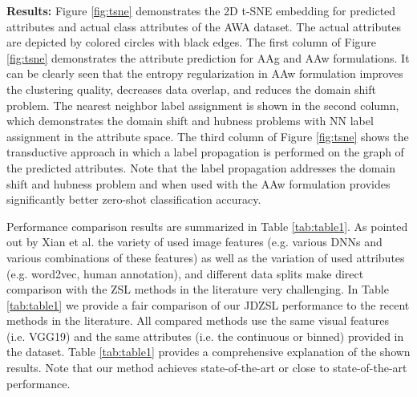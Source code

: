 \documentclass[letterpaper]{article} %
\begin{document}
{\bf Results:}  Figure \ref{fig:tsne} demonstrates the 2D t-SNE embedding  for predicted attributes and actual class attributes of the AWA dataset.  The actual attributes are depicted by colored circles with black edges. The first column of Figure \ref{fig:tsne} demonstrates the attribute prediction for AAg and AAw formulations. It can be clearly seen that the entropy regularization in AAw formulation improves the clustering quality, decreases data overlap, and reduces the domain shift problem. The nearest neighbor label assignment is shown in the second column, which demonstrates the domain shift and hubness problems with NN label assignment in the attribute space. The third column of Figure \ref{fig:tsne} shows the transductive approach in which a label propagation is performed on the graph of the predicted attributes. Note that the label propagation addresses the domain shift and hubness problem and when used with the AAw formulation provides significantly better zero-shot classification accuracy. 
  
 
Performance comparison results are summarized  in Table \ref{tab:table1}. As pointed out by Xian et al. \cite{xian2017zero} the variety of used image features (e.g. various DNNs and various combinations of these features) as well as the variation of used attributes (e.g. word2vec, human annotation), and different data splits make direct comparison with the ZSL methods in the literature very challenging. In Table \ref{tab:table1} we provide a fair comparison of our JDZSL performance to the recent methods in the literature. All compared methods use the same visual features (i.e. VGG19) and the same attributes (i.e. the continuous or binned) provided in the dataset. %
Table \ref{tab:table1} provides a comprehensive explanation of the shown results.  Note that our method achieves state-of-the-art or close to state-of-the-art performance. 
\end{document}
